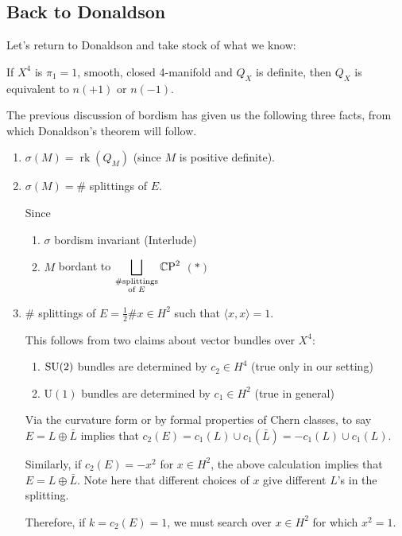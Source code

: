 \documentclass[main]{subfiles}
\begin{document}
\subsection*{Back to Donaldson}

Let's return to Donaldson and take stock of what we know:

\begin{theorem*}
If $X^4$ is $\pi_1=1$, smooth, closed 4-manifold and $Q_X$ is definite, then $Q_X$ is equivalent to $n(+1)$ or $n(-1)$.
\end{theorem*}

The previous discussion of bordism has given us the following three facts, from which Donaldson's theorem will follow.

\begin{enumerate}
	\item[(i)] $\sigma(M) = \operatorname{rk}(Q_M)$ (since $M$ is positive definite).
	\item[(ii)] $\sigma(M) = \#$ splittings of $E$.

	Since
	\begin{enumerate}
		\item $\sigma$ bordism invariant (Interlude)
		\item $M$ bordant to $\displaystyle\bigsqcup_{\substack{\text{\#splittings}\\ \text{of } E}} \mathbb C\mathrm{P}^2$ $(\ast)$
	\end{enumerate}
	\item[(iii)] $\#$ splittings of $E = \tfrac12 \# x \in H^2$ such that $\langle x,x\rangle = 1$.

	This follows from two claims about vector bundles over $X^4$:
	\begin{enumerate}
		\item $\operatorname{SU}(2)$ bundles are determined by $c_2 \in H^4$ (true only in our setting)
		\item $\mathrm{U}(1)$ bundles are determined by $c_1 \in H^2$ (true in general)
	\end{enumerate}
	Via the curvature form or by formal properties of Chern classes, to say $E = L\oplus\bar L$ implies that $c_2(E) = c_1(L)\cup c_1(\bar L) = -c_1(L)\cup c_1(L)$.

	Similarly, if $c_2(E) = -x^2$ for $x\in H^2$, the above calculation implies that $E = L\oplus\bar L$. Note here that different choices of $x$ give different $L$'s in the splitting.

	Therefore, if $k = c_2(E) = 1$, we must search over $x\in H^2$ for which $x^2=1$.
\end{enumerate}
\end{document}
